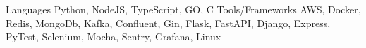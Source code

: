 \begin{cvskills}
  \cvskill
  {Languages}
  {Python, NodeJS, TypeScript, GO, C}
  \cvskill
  {Tools/Frameworks}
  {AWS, Docker, Redis, MongoDb, Kafka, Confluent, Gin, Flask, FastAPI, Django, Express, PyTest, Selenium, Mocha, Sentry, Grafana, Linux}
\end{cvskills}